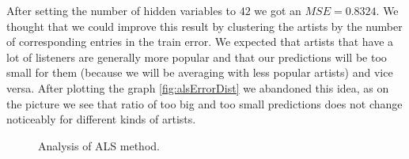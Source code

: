 \documentclass{report}
\begin{document}
After setting the number of hidden variables to $42$ we got an $MSE=0.8324$. We thought that we could improve this result by clustering the artists by the number of corresponding entries in the train error. We expected that artists that have a lot of listeners are generally more popular and that our predictions will be too small for them (because we will be averaging with less popular artists) and vice versa. After plotting the graph \ref{fig:alsErrorDist} we abandoned this idea, as on the picture we see that ratio of too big and too small predictions does not change noticeably for different kinds of artists.

\begin{figure}[!h]
\center
{}
\caption{Analysis of ALS method.}
\end{figure}
\end{document}

